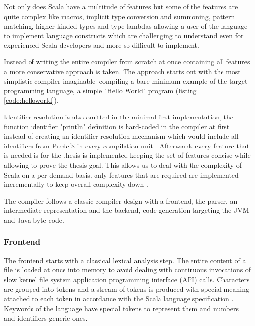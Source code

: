 \documentclass{VUMIFPSbakalaurinis}
\begin{document}
Not only does Scala have a multitude of features but some of the features are quite complex like macros, implicit type conversion and summoning, pattern matching, higher kinded types and type lambdas allowing a user of the language to implement language constructs \cite{Scala2Union, ShapelessGithub} which are challenging to understand even for experienced Scala developers and more so difficult to implement.


Instead of writing the entire compiler from scratch at once containing all features a more conservative approach is taken.
The approach starts out with the most simplistic compiler imaginable, compiling a bare minimum example of the target programming language, a simple "Hello World" program (listing \ref{code:helloworld}).



Identifier resolution is also omitted in the minimal first implementation, the function identifier "println" definition is hard-coded in the compiler at first instead of creating an identifier resolution mechanism which would include all identifiers from Predef\$ in every compilation unit \cite{Predef}.
Afterwards every feature that is needed is for the thesis is implemented keeping the set of features concise while allowing to prove the thesis goal.
This allows us to deal with the complexity of Scala on a per demand basis, only features that are required are implemented incrementally to keep overall complexity down \cite{IncrementalCompiler}.

The compiler follows a classic compiler design with a frontend, the parser, an intermediate representation and the backend, code generation targeting the JVM and Java byte code.

\subsubsection{Frontend}

The frontend starts with a classical lexical analysis step.
The entire content of a file is loaded at once into memory to avoid dealing with continuous invocations of slow kernel file system application programming interface (API) calls.
Characters are grouped into tokens and a stream of tokens is produced with special meaning attached to each token in accordance with the Scala language specification \cite{ScalaSpec}.
Keywords of the language have special tokens to represent them and numbers and identifiers generic ones.
\end{document}
